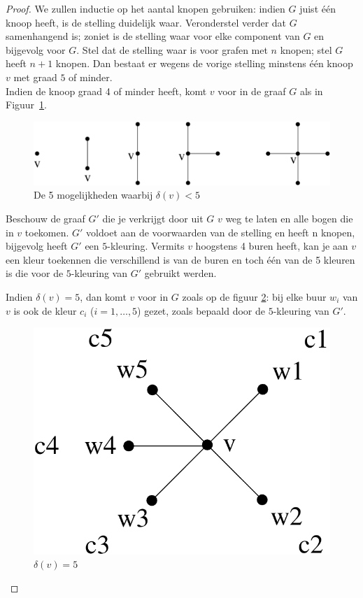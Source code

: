 \begin{proof}
We zullen inductie op het aantal knopen gebruiken: indien $G$ juist
\'{e}\'{e}n knoop heeft, is de stelling duidelijk waar.
Veronderstel verder dat $G$ samenhangend is; zoniet is de stelling waar voor
elke component van $G$ en bijgevolg voor $G$.
Stel dat de stelling waar is voor grafen met $n$ knopen; stel $G$ heeft
$n+1$ knopen. Dan bestaat er wegens de vorige stelling minstens
\'{e}\'{e}n knoop $v$ met graad $5$ of minder.\\
Indien de knoop graad 4 of minder heeft, komt $v$ voor in de graaf $G$ als
in Figuur~\ref{5kleuring1}.

\begin{figure}[ht]
\begin{center}
\includegraphics[width=0.6\linewidth,keepaspectratio]{5kleuring1}
\end{center}
\caption{De 5 mogelijkheden waarbij $\delta(v) < 5$ \label{5kleuring1}}
\end{figure}

Beschouw de graaf $G'$ die je verkrijgt door uit $G$ $v$ weg te laten en
alle bogen die in $v$ toekomen. $G'$ voldoet aan de voorwaarden van de
stelling en heeft n knopen, bijgevolg heeft $G'$ een $5$-kleuring. Vermits
$v$ hoogstens 4 buren heeft, kan je aan $v$ een kleur toekennen die
verschillend is van de buren en toch \'{e}\'{e}n van de 5 kleuren is
die voor de $5$-kleuring van $G'$ gebruikt werden.

Indien $\delta(v) = 5$, dan komt $v$ voor in $G$ zoals op de figuur
\ref{5kleuring2}: bij elke buur $w_{i}$ van $v$ is ook de kleur $c_{i}$
($i = 1,\ldots,5$) gezet, zoals bepaald door de $5$-kleuring van $G'$.

\begin{figure}[ht]
\begin{center}
\includegraphics[width=0.25\linewidth,keepaspectratio]{5kleuring2}
\end{center}
\caption{$\delta(v) = 5$ \label{5kleuring2}}
\end{figure}


\end{proof}
